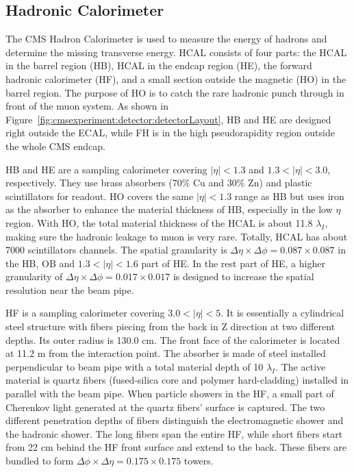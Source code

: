 \subsection{Hadronic Calorimeter}
The CMS Hadron Calorimeter \cite{cms:hcalTdrCMS:1997xji} is used to measure the energy of hadrons and determine the missing transverse energy. HCAL consists of four parts: the HCAL in the barrel region (HB), HCAL in the endcap region (HE), the forward hadronic calorimeter (HF), and a small section outside the magnetic (HO) in the barrel region. The purpose of HO is to catch the rare hadronic punch through in front of the muon system. As shown in Figure~\ref{fig:cmsexperiment:detector:detectorLayout}, HB and HE are designed right outside the ECAL, while FH is in the high pseudorapidity region outside the whole CMS endcap.

HB and HE are a sampling calorimeter covering $|\eta|< 1.3$ and $1.3<|\eta|< 3.0$, respectively. They use brass absorbers ($70\%$ Cu and $30\%$ Zn) and plastic scintillators for readout. HO covers the same $|\eta|< 1.3$ range as HB but uses iron as the absorber to enhance the material thickness of HB, especially in the low $\eta$ region. With HO, the total material thickness of the HCAL is about 11.8 $\lambda_I$, making sure the hadronic leakage to muon is very rare. Totally, HCAL has about 7000 scintillators channels. The spatial granularity is $\Delta \eta \times \Delta \phi = 0.087 \times 0.087$ in the HB, OB and $1.3<|\eta|< 1.6$ part of HE. In the rest part of HE, a higher granularity of $\Delta \eta \times \Delta \phi = 0.017 \times 0.017$ is designed to increase the spatial resolution near the beam pipe.

HF is a sampling calorimeter covering $3.0 < |\eta| < 5$. It is essentially a cylindrical steel structure with fibers piecing from the back in Z direction at two different depths. Its outer radius is 130.0 cm. The front face of the calorimeter is located at 11.2 m from the interaction point. The absorber is made of steel installed perpendicular to beam pipe with a total material depth of 10 $\lambda_I$. The active material is quartz fibers (fused-silica core and polymer hard-cladding) installed in parallel with the beam pipe. When particle showers in the HF, a small part of Cherenkov light generated at the quartz fibers' surface is captured. The two different penetration depths of fibers distinguish the electromagnetic shower and the hadronic shower. The long fibers span the entire HF, while short fibers start from 22 cm behind the HF front surface and extend to the back. These fibers are bundled to form $\Delta \phi \times \Delta \eta = 0.175 \times 0.175$ towers. 



